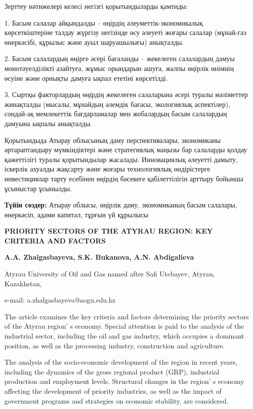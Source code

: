 Зерттеу нәтижелері келесі негізгі қорытындыларды қамтиды:

1. Басым салалар айқындалды -- өңірдің әлеуметтік-экономикалық
көрсеткіштеріне талдау жүргізу негізінде өсу әлеуеті жоғары салалар
(мұнай-газ өнеркәсібі, құрылыс және ауыл шаруашылығы) анықталды.

2. Басым салалардың өңірге әсері бағаланды -- жекелеген салалардың дамуы
монотәуелділікті азайтуға, жұмыс орындарын ашуға, жалпы өңірлік
өнімнің өсуіне және орнықты дамуға ықпал ететіні көрсетілді.

3. Сыртқы факторлардың өңірдің жекелеген салаларына әсері туралы
мәліметтер жинақталды (мысалы, мұнайдың әлемдік бағасы, экологиялық
аспектілер), сондай-ақ мемлекеттік бағдарламалар мен жобалардың басым
салалардың дамуына ықпалы анықталды.

Қорытындыда Атырау облысының даму перспективалары, экономиканы
әртараптандыру мүмкіндіктері және стратегиялық маңызы бар салаларды
қолдау қажеттілігі туралы қорытындылар жасалады. Инновациялық әлеуетті
дамыту, іскерлік ахуалды жақсарту және жоғары технологиялық өндірістерге
инвестициялар тарту есебінен өңірдің бәсекеге қабілеттілігін арттыру
бойынша ұсыныстар ұсынылды.

{\bfseries Түйін сөздер:} Атырау облысы, өңірлік даму, экономиканың басым
салалары, өнеркәсіп, адами капитал, тұрғын үй құрылысы
\newpage
\begin{articleheader}
{\bfseries PRIORITY SECTORS OF THE ATYRAU REGION: KEY CRITERIA AND FACTORS}

{\bfseries
A.A. Zhalgasbayeva\textsuperscript{\envelope },
S.K. Bukanova,
A.N. Abdigalieva
}
\end{articleheader}

\begin{affiliation}
Atyrau University of Oil and Gas named after Safi Utebayev, Atyrau, Kazakhstan,

e-mail: a.zhalgasbayeva@aogu.edu.kz
\end{affiliation}

The article examines the key criteria and factors determining the
priority sectors of the Atyrau region' s economy. Special
attention is paid to the analysis of the industrial sector, including
the oil and gas industry, which occupies a dominant position, as well as
the processing industry, construction and agriculture.

The analysis of the socio-economic development of the region in recent
years, including the dynamics of the gross regional product (GRP),
industrial production and employment levels. Structural changes in the
region' s economy affecting the development of priority
industries, as well as the impact of government programs and strategies
on economic stability, are considered.

